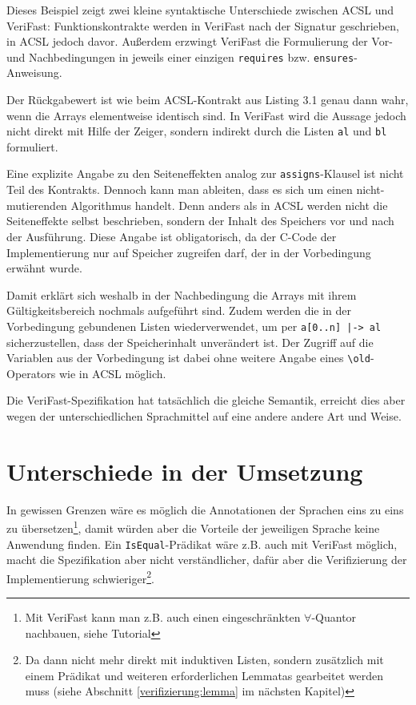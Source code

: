 

Dieses Beispiel zeigt zwei kleine syntaktische Unterschiede zwischen ACSL und VeriFast: Funktionskontrakte
werden in VeriFast nach der Signatur geschrieben, in ACSL jedoch davor. Außerdem erzwingt VeriFast die
Formulierung der Vor- und Nachbedingungen in jeweils einer einzigen \lstinline{requires} bzw. \lstinline{ensures}-Anweisung.

Der Rückgabewert ist wie beim ACSL-Kontrakt aus Listing 3.1 genau dann wahr, wenn die Arrays elementweise
identisch sind. In VeriFast wird die Aussage jedoch nicht direkt mit Hilfe der Zeiger, sondern indirekt durch die
Listen \lstinline{al} und \lstinline{bl} formuliert.

Eine explizite Angabe zu den Seiteneffekten analog zur \lstinline{assigns}-Klausel ist nicht Teil des Kontrakts. 
Dennoch kann man ableiten, dass es sich um einen nicht-mutierenden Algorithmus handelt. Denn anders als in ACSL
werden nicht die Seiteneffekte selbst beschrieben, sondern der Inhalt des Speichers vor und nach der Ausführung.
Diese Angabe ist obligatorisch, da der C-Code der Implementierung nur auf Speicher zugreifen darf, der in der
Vorbedingung erwähnt wurde.

Damit erklärt sich weshalb in der Nachbedingung die Arrays mit ihrem Gültigkeitsbereich nochmals aufgeführt sind.
Zudem werden die in der Vorbedingung gebundenen Listen wiederverwendet, um per \lstinline{a[0..n] |-> al}
sicherzustellen, dass der Speicherinhalt unverändert ist. Der Zugriff auf die Variablen aus der Vorbedingung ist
dabei ohne weitere Angabe eines \lstinline{\old}-Operators wie in ACSL möglich.

Die VeriFast-Spezifikation hat tatsächlich die gleiche Semantik, erreicht dies aber wegen der 
unterschiedlichen Sprachmittel auf eine andere andere Art und Weise.


\section{Unterschiede in der Umsetzung}

In gewissen Grenzen wäre es möglich die Annotationen der Sprachen eins zu eins zu übersetzen\footnote{Mit
VeriFast kann man z.B. auch einen eingeschränkten \(\forall\)-Quantor nachbauen, siehe Tutorial\cite[Kap. 17]{jacobs-tutorial}},
damit würden aber die Vorteile der jeweiligen Sprache keine Anwendung finden. Ein \lstinline{IsEqual}-Prädikat wäre z.B.
auch mit VeriFast möglich, macht die Spezifikation aber nicht verständlicher, dafür aber die Verifizierung
der Implementierung schwieriger\footnote{Da dann nicht mehr direkt mit induktiven Listen, sondern zusätzlich
mit einem Prädikat und weiteren erforderlichen Lemmatas gearbeitet werden muss (siehe Abschnitt
\ref{verifizierung:lemma} im nächsten Kapitel)}.

